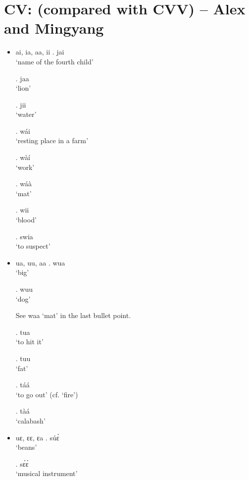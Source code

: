 \documentclass{assets/fieldnotes}
\begin{document}
\section{CV: (compared with CVV) -- Alex and Mingyang}
\begin{itemize}
    \item ai, ia, aa, ii
        \ex. jai\\
            `name of the fourth child'
            
        \ex. jaa\\
            `lion'

        \ex. jii\\
            `water'

        \ex. wái\\
            `resting place in a farm'

        \ex. wàí\\
            `work'
        
        \ex. wáà\\
            `mat'

        \ex. wii\\
            `blood'

        \ex. swia\\
            `to suspect'

    \item ua, uu, aa
        \ex. wua\\
            `big'

        \ex. wuu\\
            `dog'

        See waa `mat' in the last bullet point.

        \ex. tua\\
            `to hit it'

        \ex. tuu\\
            `fat'

        \ex. táá\\
            `to go out' (cf. `fire')

        \ex. tàá\\
            `calabash'

    \item uɛ, ɛɛ, ɛa
        \ex. súɛ́\\
            `beans'

        \ex. sɛ́ɛ́\\
            `musical instrument'


\end{itemize}
\end{document}
